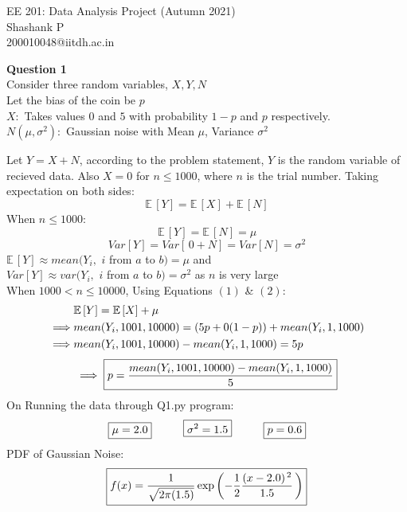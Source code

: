 \documentclass[30pt a4paper]{report}
\begin{document}
	\Large
	\begin{center}
		\Large EE 201: Data Analysis Project (Autumn 2021) \\
		\large
		\hspace{10pt}
		Shashank P \\
		200010048@iitdh.ac.in\\
	\end{center}
	\normalsize
\textbf{\Large Question 1 \\}
	Consider three random variables, $X, Y, N$ \\
	Let the bias of the coin be $p$\\
	$X:$ Takes values $0$ and $5$ with probability $1-p$ and $p$ respectively. \\
	$N(\mu, \sigma^2):$ Gaussian noise with Mean $\mu$, Variance $\sigma^2$ \par
	Let $Y = X + N$, according to the problem statement, $Y$ is the random variable of recieved data. Also $X=0$ for $n\le1000$, where $n$ is the trial number. Taking expectation on both sides:\\
	\begin{equation}\mathbb{E}\,[Y] = \mathbb{E}\,[X] + \mathbb{E}\,[N] \end{equation} 
	When $n\le1000:$ 
	\begin{equation} 
		\mathbb{E}\,[Y] = \mathbb{E}\,[N] = \mu 
	\end{equation}
	\begin{equation}
		Var[Y] = Var[\,0+ N] = Var[N] = \sigma^2 
	\end{equation}
	$\mathbb{E}\,[Y] \approx mean(Y_i,$ $i$ from $a$ to $b) = \mu$ and \\ 
	$Var[Y] \approx var(Y_i,$ $i$ from $a$ to $b) = \sigma^2$  as $n$ is very large \\
	When $1000<n\le10000$, Using Equations $(1)$ \& $(2)$:
	\begin{align*} 
		&\mathbb{E}\,[Y] = \mathbb{E}\,[X] + \mu \notag \newline \notag \\
		\implies& mean(Y_i, 1001, 10000) = (5p + 0(1-p)) + mean(Y_i, 1, 1000) \notag \\
		\implies& mean(Y_i, 1001, 10000) - mean(Y_i, 1, 1000) = 5p \notag
	\end{align*}
\begin{equation}
	\implies\boxed{ p = \frac{mean(Y_i, 1001, 10000) - mean(Y_i, 1, 1000)}{5}} \notag
\end{equation}
On Running the data through Q1.py program:
\begin{equation}
	\boxed{\mu = 2.0} \hspace{1cm} \boxed{\sigma^2 = 1.5} \hspace{1cm} \boxed{p = 0.6} \notag
\end{equation}
PDF of Gaussian Noise:
\begin{equation}
\boxed{f(x) = \frac{1}{\sqrt{2\pi(1.5)}} 
\exp\left( -\frac{1}{2}\frac{(x-2.0)^{\,2}}{1.5}\,\right)} \notag
\end{equation}
\end{document}
